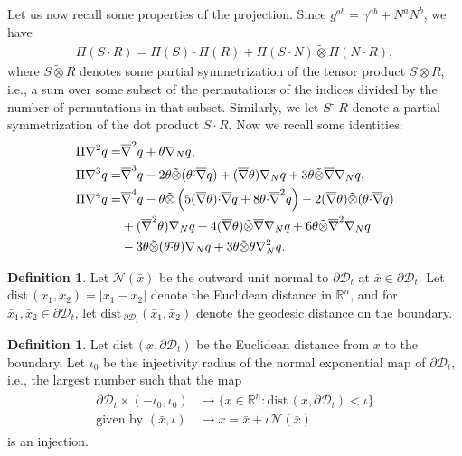 \documentclass[12pt,reqno]{amsart}
\numberwithin{equation}{section}
\theoremstyle{definition}
\newtheorem{definition}[theorem]{Definition}
\theoremstyle{remark}
\begin{document}
Let us now recall some properties of the projection. Since $g^{ab}=\gamma^{ab}+N^aN^b$, we have
\begin{align}\label{eq.CL004.48}
  \Pi(S\cdot R)=\Pi(S)\cdot \Pi(R)+\Pi(S\cdot N)\tilde{\otimes}\Pi(N\cdot R),
\end{align}
where $S\tilde{\otimes} R$ denotes some partial symmetrization of the tensor product $S\otimes R$, i.e., a sum over some subset of the permutations of the indices divided by the number of permutations in that subset. Similarly, we let $S\tilde{\cdot} R$ denote a partial symmetrization of the dot product $S\cdot R$. Now we recall some identities:
\begin{align}
  \Pi{\nabla}^2 q=&{\overline{\nabla}}^2 q+\theta {\nabla}_N q,\label{eq.CL004.20}\\
  \Pi{\nabla}^3 q=&{\overline{\nabla}}^3 q-2\theta\tilde{\otimes}(\theta\tilde{\cdot}{\overline{\nabla}} q)+({\overline{\nabla}}\theta){\nabla}_N q+3\theta\tilde{\otimes}{\overline{\nabla}}{\nabla}_N q,\label{eq.CL004.21}\\
  \Pi{\nabla}^4 q=&{\overline{\nabla}}^4 q-\theta\tilde{\otimes}\left(5({\overline{\nabla}}\theta)\tilde{\cdot}{\overline{\nabla}} q+8\theta\tilde{\cdot}{\overline{\nabla}}^2 q\right)-2({\overline{\nabla}}\theta)\tilde{\otimes}(\theta\tilde{\cdot}{\overline{\nabla}} q){\nonumber}\\
  &+({\overline{\nabla}}^2\theta){\nabla}_Nq+4({\overline{\nabla}}\theta)\tilde{\otimes}{\overline{\nabla}}{\nabla}_Nq+6\theta\tilde{\otimes}{\overline{\nabla}}^2{\nabla}_N q{\nonumber}\\
  &-3\theta\tilde{\otimes}(\theta\tilde{\cdot}\theta){\nabla}_N q+3\theta\tilde{\otimes}\theta {\nabla}_N^2q.\label{eq.CL004.22}
\end{align}

\begin{definition}\label{defn.3.3}
  Let ${\mathcal{N}}(\bar{x})$ be the outward unit normal to ${\partial}{{\mathscr{D}_t}}$ at $\bar{x}\in {\partial}{{\mathscr{D}_t}}$. Let ${\mathrm{dist}\,}(x_1,x_2)=|x_1-x_2|$ denote the Euclidean distance in ${\mathbb R}^n$, and for $\bar{x}_1, \bar{x}_2\in {\partial}{{\mathscr{D}_t}}$, let ${\mathrm{dist}\,}_{{\partial}{{\mathscr{D}_t}}} (\bar{x}_1, \bar{x}_2)$ denote the geodesic distance on the boundary.
\end{definition}

\begin{definition}\label{defn.3.4}
  Let ${\mathrm{dist}\,}(x,{\partial}{{\mathscr{D}_t}})$ be the Euclidean distance from $x$ to the boundary. Let $\iota_0$ be the injectivity radius of the normal exponential map of ${\partial}{{\mathscr{D}_t}}$, i.e., the largest number such that the map
\begin{align}
  \begin{aligned}
    {\partial}{{\mathscr{D}_t}}\times (-\iota_0,\iota_0)&\to\{x\in{\mathbb R}^n: {\mathrm{dist}\,}(x,{\partial}{{\mathscr{D}_t}})<\iota\}\\
    \text{given by } (\bar{x},\iota)&\to x=\bar{x}+\iota {\mathcal{N}}(\bar{x})
  \end{aligned}
\end{align}
is an injection.
\end{definition}
\end{document}
